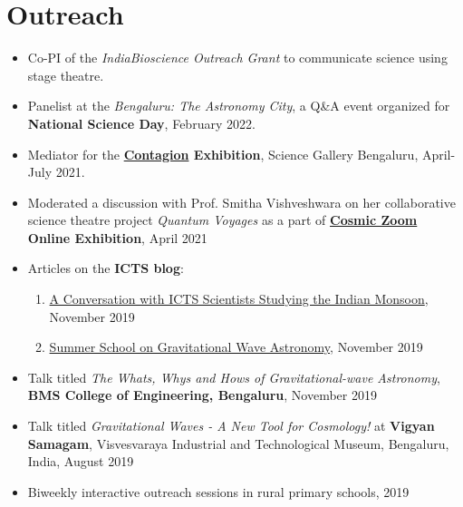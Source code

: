 		\section{Outreach}
		\begin{itemize}[leftmargin=*]
			\item Co-PI of the \textit{IndiaBioscience Outreach Grant} to communicate science using stage theatre.
			\item Panelist at the \textit{Bengaluru: The Astronomy City}, a Q\&A event organized for \textbf{National Science Day}, February 2022.
			\item Mediator for the \textbf{\href{https://bengaluru.sciencegallery.com/contagion-archive}{Contagion} Exhibition}, Science Gallery Bengaluru, April-July 2021.
			\item Moderated a discussion with Prof. Smitha Vishveshwara on her collaborative science theatre project \textit{Quantum Voyages} as a part of \textbf{\href{https://cosmic-zoom.in/}{Cosmic Zoom} Online Exhibition}, April 2021
			\item Articles on the \textbf{ICTS blog}:
			\begin{enumerate}
				\item \href{https://blog.icts.res.in/blog/conversation-icts-scientists-studying-indian-monsoon}{A Conversation with ICTS Scientists Studying the Indian Monsoon}, November 2019
				\item \href{https://blog.icts.res.in/blog/summer-school-gravitational-wave-astronomy}{Summer School on Gravitational Wave Astronomy}, November 2019
			\end{enumerate}	
			\item Talk titled \textit{The Whats, Whys and Hows of Gravitational-wave Astronomy}, \textbf{BMS College of Engineering, Bengaluru}, November 2019
			\item Talk titled \textit{Gravitational Waves - A New Tool for Cosmology!} at \textbf{Vigyan Samagam}, Visvesvaraya Industrial and Technological Museum, Bengaluru, India, August 2019
            \item Biweekly interactive outreach sessions in rural primary schools, 2019	
		\end{itemize}
		
		
		
		
